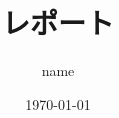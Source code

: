 \documentclass[a4j]{jarticle}
\title{レポート}
\author{name}
\date{\today}
\begin{document}
\maketitle

\begin{comment}

\section{section}
\subsection{subsection}

\begin{figure}[hbtp]
  \begin{center}
    \texttt{[image: ER.png]}
    \caption{fig1}
    \label{fig:hoge}
  \end{center}
\end{figure}

\begin{table}[htb]
  \begin{center}
    \caption{title}
    \begin{tabular}{l||r|c} 
      table & foo & bar \\ \hline\hline
      tab1 & 1 & 2  \\ \hline
      tab2 & 1 & 2  \\ \hline
      tab3 & 1 & 2 \\ 
    \end{tabular}
    \label{tab:hoge}
  \end{center}
\end{table}

\ref{fig:hoge}
\ref{tab:hoge}

\begin{description}
\item[item1]\mbox{}\\ 
\item[item2]\mbox{}\\
\item[item3]\mbox{}\\
\end{description}  


\begin{verbatim}
\end{verbatim}
  
\verb+ hoge +

\footnote{hoge}

\appendix

\begin{thebibliography}{99}
\bibitem{book1} book1
\bibitem{book2} book2
\bibitem{page1} page1
\end{thebibliography}

\end{comment}
\end{document}
